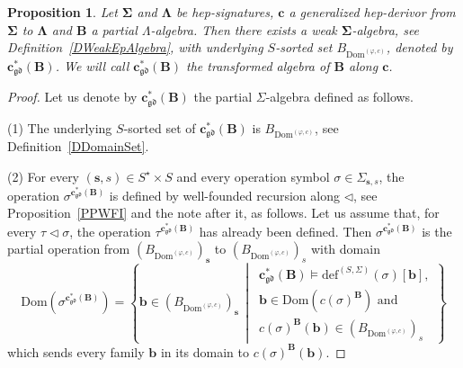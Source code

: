 \documentclass[a4paper, reqno
]{amsart}
\newcommand{\sig}[1]{\mathbf{#1}}             %
\newcommand{\Dom}{\mathrm{Dom}}
\newcommand{\gd}{\mathfrak{gd}}              %
\theoremstyle{plain}
\newtheorem{proposition}[theorem]{Proposition}
\theoremstyle{definition}
\begin{document}
\begin{proposition}\label{PTransformedAlg}
Let $\sig{\Sigma}$ and $\sig{\Lambda}$ be hep-signatures, $\mathbf{c}$ a generalized hep-derivor from $\sig{\Sigma}$ to $\sig{\Lambda}$ and $\mathbf{B}$ a partial $\Lambda$-algebra.
Then there exists a weak $\sig{\Sigma}$-algebra, see Definition~\ref{DWeakEpAlgebra}, with underlying $S$-sorted set $B_{\Dom^{(\varphi,c)}}$, denoted by $\mathbf{c}^{\ast}_{\gd}(\mathbf{B})$.
We will call $\mathbf{c}^{\ast}_{\gd}(\mathbf{B})$ the \emph{transformed algebra} of $\mathbf{B}$ along $\mathbf{c}$.
\end{proposition}
\begin{proof}
Let us denote by $\mathbf{c}^{\ast}_{\gd}(\mathbf{B})$ the partial $\Sigma$-algebra defined as follows.

\textsf{(1)} The underlying $S$-sorted set of $\mathbf{c}^{\ast}_{\gd}(\mathbf{B})$ is $B_{\Dom^{(\varphi,c)}}$, see Definition~\ref{DDomainSet}.

\textsf{(2)} For every $(\mathbf{s},s)\in S^{\star}\times S$ and every operation symbol $\sigma\in\Sigma_{\mathbf{s},s}$, the operation $\sigma^{\mathbf{c}^{\ast}_{\gd}(\mathbf{B})}$ is defined by well-founded recursion along $\lhd$, see Proposition~\ref{PPWFI} and the note after it, as follows.
Let us assume that, for every $\tau\lhd\sigma$, the operation $\tau^{\mathbf{c}^{\ast}_{\gd}(\mathbf{B})}$ has already been defined.
Then $\sigma^{\mathbf{c}^{\ast}_{\gd}(\mathbf{B})}$ is the partial operation from $(B_{\Dom^{(\varphi,c)}})_{\mathbf{s}}$ to $(B_{\Dom^{(\varphi,c)}})_{s}$ with domain
$$
\Dom\left(\sigma^{\mathbf{c}^{\ast}_{\gd}(\mathbf{B})}\right)
=
\left\lbrace
\mathbf{b}\in\left(B_{\Dom^{(\varphi,c)}}\right)_{\mathbf{s}}
\,\middle|\,
\begin{array}{l}
\mathbf{c}^{\ast}_{\gd}(\mathbf{B})\models\mathrm{def}^{(S,\Sigma)}(\sigma)[\mathbf{b}],\\
\mathbf{b}\in\Dom\left(c(\sigma)^{\mathbf{B}}\right)\text{ and}\\
c(\sigma)^{\mathbf{B}}(\mathbf{b})\in\left(B_{\Dom^{(\varphi,c)}}\right)_{s}
\end{array}
\right\rbrace
$$
which sends every family $\mathbf{b}$ in its domain to $c(\sigma)^{\mathbf{B}}(\mathbf{b})$.


\end{proof}
\end{document}
